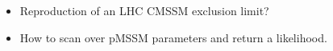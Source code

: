
\begin{itemize}
\item Reproduction of an LHC CMSSM exclusion limit?
\item How to scan over pMSSM parameters and return a likelihood.

\end{itemize}
